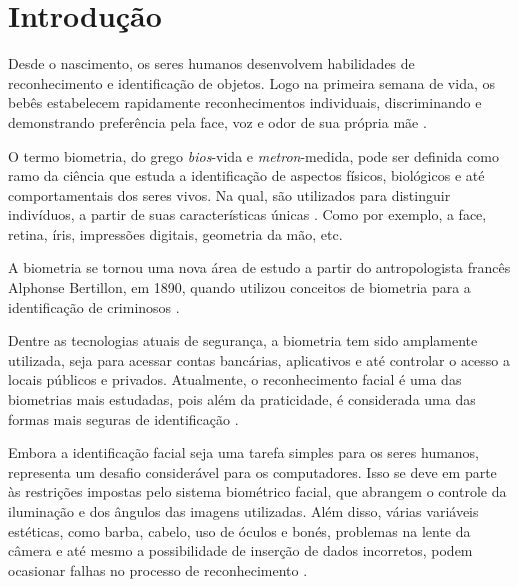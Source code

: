 
\chapter{Introdução}\label{cap:introducao}

Desde o nascimento, os seres humanos desenvolvem habilidades de reconhecimento 
e identificação de objetos. Logo na primeira semana de vida, os bebês estabelecem 
rapidamente reconhecimentos individuais, discriminando e demonstrando preferência 
pela face, voz e odor de sua própria mãe \cite{vieira2017}.

O termo biometria, do grego \textit{bios}-vida e \textit{metron}-medida, pode ser 
definida como ramo da ciência que estuda a identificação de aspectos físicos, biológicos e até 
comportamentais dos seres vivos. Na qual, são utilizados para distinguir indivíduos, 
a partir de suas características únicas \cite{ferreira2009}. Como por exemplo, a face, retina, 
íris, impressões digitais, geometria da mão, etc.

A biometria se tornou uma nova área de estudo a partir do antropologista francês
Alphonse Bertillon, em 1890, quando utilizou conceitos de biometria para a 
identificação de criminosos \cite{moraes2006}. 

Dentre as tecnologias atuais de segurança, a biometria tem sido amplamente 
utilizada, seja para acessar contas bancárias, aplicativos e até controlar 
o acesso a locais públicos e privados. Atualmente, o reconhecimento facial 
é uma das biometrias mais estudadas, pois além da praticidade, é considerada uma 
das formas mais seguras de identificação \cite{zhao2003}. 

Embora a identificação facial seja uma tarefa simples para os seres humanos, 
representa um desafio considerável para os computadores. Isso se deve em 
parte às restrições impostas pelo sistema biométrico facial, que abrangem 
o controle da iluminação e dos ângulos das imagens utilizadas. Além disso, 
várias variáveis estéticas, como barba, cabelo, uso de óculos e bonés, 
problemas na lente da câmera e até mesmo a possibilidade de inserção de 
dados incorretos, podem ocasionar falhas no processo de 
reconhecimento \cite{cavalcanti2005}.


